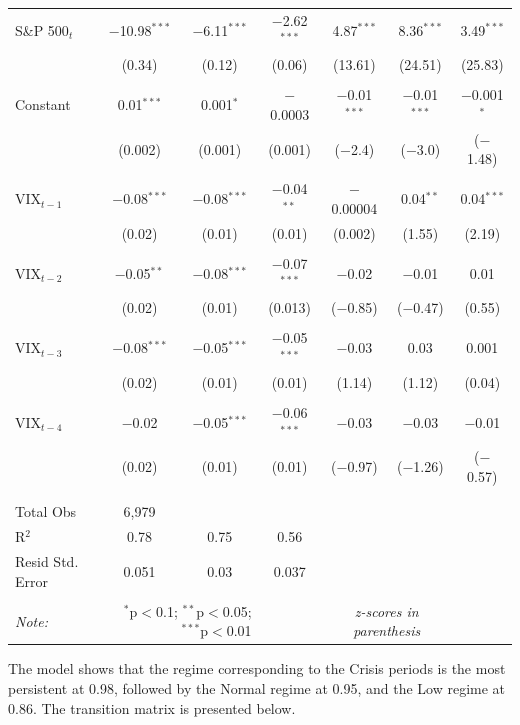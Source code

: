 \documentclass[11pt,a4paper,oldfontcommands]{memoir}
\begin{document}
{\begin{table}[H]
\begin{tabular}{@{\extracolsep{0pt}}lccc|ccc}
 S\&P 500$_t$ & $-$10.98$^{***}$ & $-$6.11$^{***}$ & $-$2.62$^{***}$  & 4.87$^{***}$ & 8.36$^{***}$ & 3.49$^{***}$\\ 
  & (0.34) & (0.12) & (0.06)  & (13.61) & (24.51) & (25.83) \\ 
  & & \\ 
 Constant & 0.01$^{***}$ & 0.001$^{*}$ & $-$0.0003 & $-$0.01$^{***}$ & $-$0.01$^{***}$ & $-$0.001$^{*}$\\ 
  & (0.002) & (0.001) & (0.001) & ($-$2.4) & ($-$3.0) & ($-$1.48)\\ 
  & & \\ 
 VIX$_{t-1}$ & $-$0.08$^{***}$ & $-$0.08$^{***}$ & $-$0.04$^{**}$ & $-$0.00004 & 0.04$^{**}$ & 0.04$^{***}$\\ 
  & (0.02) & (0.01) & (0.01) & (0.002) & (1.55) & (2.19)\\ 
  & & \\ 
 VIX$_{t-2}$ & $-$0.05$^{**}$ & $-$0.08$^{***}$ & $-$0.07$^{***}$& $-$0.02 & $-$0.01 & 0.01 \\ 
  & (0.02) & (0.01) & (0.013) & ($-$0.85) & ($-$0.47) & (0.55) \\ 
  & & \\ 
 VIX$_{t-3}$ & $-$0.08$^{***}$ & $-$0.05$^{***}$ & $-$0.05$^{***}$ & $-$0.03 & 0.03 & 0.001\\ 
  & (0.02) & (0.01) & (0.01) & (1.14) & (1.12) & (0.04)\\ 
  & & \\ 
 VIX$_{t-4}$ & $-$0.02 & $-$0.05$^{***}$ & $-$0.06$^{***}$ & $-$0.03 & $-$0.03 & $-$0.01  \\ 
  & (0.02) & (0.01) & (0.01)& ($-$0.97) & ($-$1.26) & ($-$0.57) \\ 
  & & \\ 
\hline \\[-1.8ex] 
Total Obs & 6,979 \\ 
R$^{2}$ & 0.78 & 0.75 & 0.56 \\ 
Resid Std. Error & 0.051 & 0.03 & 0.037 \\ 
\hline 
\hline \\[-1.8ex] 
\textit{Note:}  & \multicolumn{2}{r}{$^{*}$p$<$0.1; $^{**}$p$<$0.05; $^{***}$p$<$0.01} & & \multicolumn{2}{c}{\textit{z-scores in parenthesis}} \\ 
\end{tabular} 
\end{table} 

The model shows that the regime corresponding to the Crisis periods is the most persistent at 0.98, followed by the Normal regime at 0.95, and the Low regime at 0.86. The transition matrix is presented below.   

}
\end{document}
